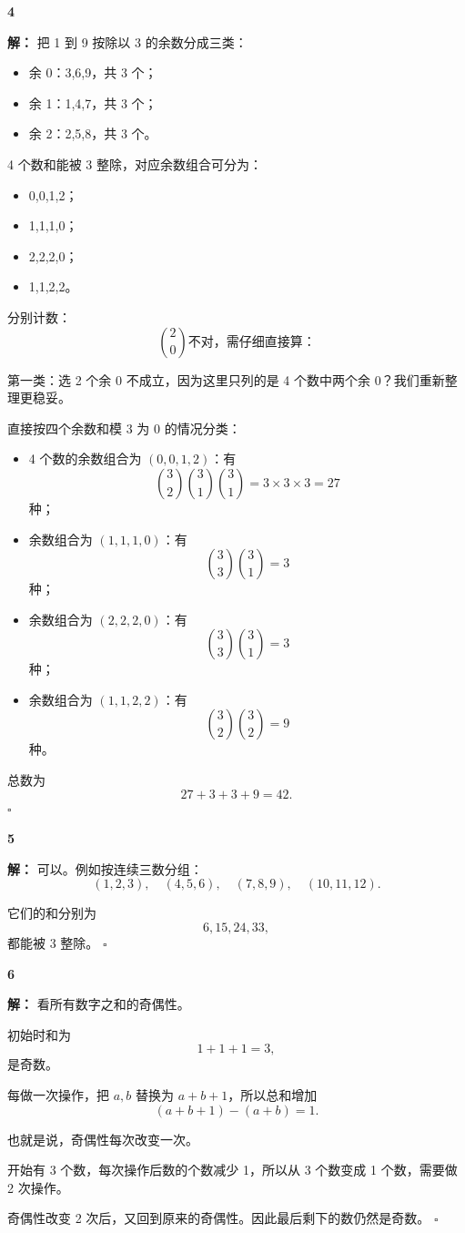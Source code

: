 \documentclass[11pt,a4paper,fontset=fandol]{ctexart}
\theoremstyle{formaltheorem}
\theoremstyle{formalexample}
\newenvironment{solution}{\par\noindent\textbf{解：}}{\hfill$\square$\par}
\begin{document}
\textbf{4}\begin{solution}
把 1 到 9 按除以 3 的余数分成三类：
\begin{itemize}
  \item 余 0：3,6,9，共 3 个；
  \item 余 1：1,4,7，共 3 个；
  \item 余 2：2,5,8，共 3 个。
\end{itemize}

4 个数和能被 3 整除，对应余数组合可分为：
\begin{itemize}
  \item 0,0,1,2；
  \item 1,1,1,0；
  \item 2,2,2,0；
  \item 1,1,2,2。
\end{itemize}

分别计数：
\[
\binom20\text{不对，需仔细直接算：}
\]

第一类：选 2 个余 0 不成立，因为这里只列的是 4 个数中两个余 0？我们重新整理更稳妥。

直接按四个余数和模 3 为 0 的情况分类：
\begin{itemize}
  \item 4 个数的余数组合为 $(0,0,1,2)$：有
  \[
  \binom32\binom31\binom31=3\times 3\times 3=27
  \]
  种；
  \item 余数组合为 $(1,1,1,0)$：有
  \[
  \binom33\binom31=3
  \]
  种；
  \item 余数组合为 $(2,2,2,0)$：有
  \[
  \binom33\binom31=3
  \]
  种；
  \item 余数组合为 $(1,1,2,2)$：有
  \[
  \binom32\binom32=9
  \]
  种。
\end{itemize}

总数为
\[
27+3+3+9=42.
\]
\end{solution}

\textbf{5}\begin{solution}
可以。例如按连续三数分组：
\[
(1,2,3),\quad (4,5,6),\quad (7,8,9),\quad (10,11,12).
\]

它们的和分别为
\[
6,15,24,33,
\]
都能被 3 整除。
\end{solution}

\textbf{6}\begin{solution}
看所有数字之和的奇偶性。

初始时和为
\[
1+1+1=3,
\]
是奇数。

每做一次操作，把 $a,b$ 替换为 $a+b+1$，所以总和增加
\[
(a+b+1)-(a+b)=1.
\]

也就是说，奇偶性每次改变一次。

开始有 3 个数，每次操作后数的个数减少 1，所以从 3 个数变成 1 个数，需要做 2 次操作。

奇偶性改变 2 次后，又回到原来的奇偶性。因此最后剩下的数仍然是奇数。
\end{solution}
\end{document}
